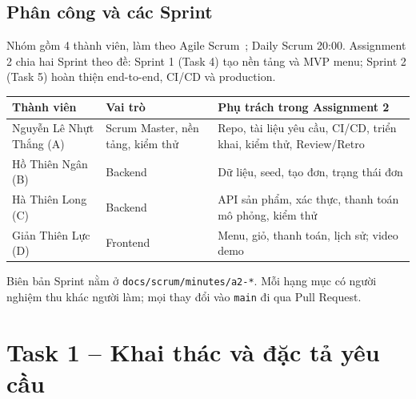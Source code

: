\documentclass[a4paper]{article}
\begin{document}
\subsection{Phân công và các Sprint}
Nhóm gồm 4 thành viên, làm theo Agile Scrum~\cite{scrum}; Daily Scrum 20:00. Assignment 2 chia hai Sprint theo đề: Sprint 1 (Task 4) tạo nền tảng và MVP menu; Sprint 2 (Task 5) hoàn thiện end-to-end, CI/CD và production.
\begin{center}
\small\everymath{}
\begin{tabular}{@{}p{3.7cm}p{4.2cm}p{5.6cm}@{}}
\toprule
\textbf{Thành viên} & \textbf{Vai trò} & \textbf{Phụ trách trong Assignment 2} \\ \midrule
Nguyễn Lê Nhựt Thắng (A) & Scrum Master, nền tảng, kiểm thử & Repo, tài liệu yêu cầu, CI/CD, triển khai, kiểm thử, Review/Retro \\
Hồ Thiên Ngân (B) & Backend & Dữ liệu, seed, tạo đơn, trạng thái đơn \\
Hà Thiên Long (C) & Backend & API sản phẩm, xác thực, thanh toán mô phỏng, kiểm thử \\
Giản Thiên Lực (D) & Frontend & Menu, giỏ, thanh toán, lịch sử; video demo \\
\bottomrule
\end{tabular}
\end{center}
Biên bản Sprint nằm ở \texttt{docs/scrum/minutes/a2-*}. Mỗi hạng mục có người nghiệm thu khác người làm; mọi thay đổi vào \texttt{main} đi qua Pull Request.

\section{Task 1 -- Khai thác và đặc tả yêu cầu}
\end{document}
